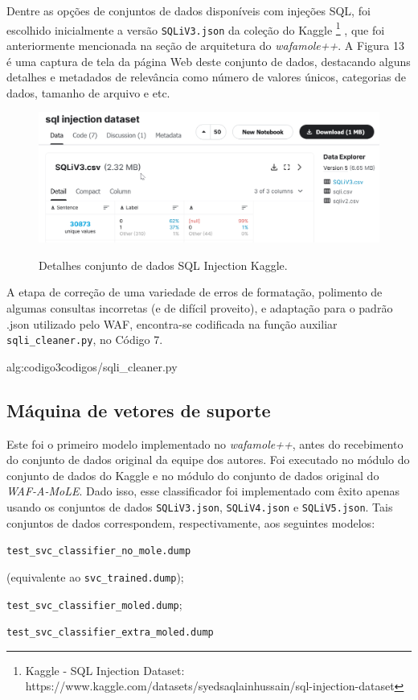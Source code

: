 Dentre as opções de conjuntos de dados disponíveis com injeções SQL, foi escolhido inicialmente a versão \verb+SQLiV3.json+ da coleção do Kaggle \footnote{Kaggle - SQL Injection Dataset: https://www.kaggle.com/datasets/syedsaqlainhussain/sql-injection-dataset} \cite{kaggle_dataset_sql}, que foi anteriormente mencionada na seção de arquitetura do \textit{wafamole++}. A Figura 13 é uma captura de tela da página Web deste conjunto de dados, destacando alguns detalhes e metadados de relevância como número de valores únicos, categorias de dados, tamanho de arquivo e etc.

\begin{figure}[ht]
    \centering
    \caption{Detalhes conjunto de dados SQL Injection Kaggle.}
    \includegraphics[width=16cm]{figuras/sqlInjectionDataset.png} 
    \label{fig:internet} 
\end{figure}

A etapa de correção de uma variedade de erros de formatação, polimento de algumas consultas incorretas (e de difícil proveito), e adaptação para o padrão .json utilizado pelo WAF, encontra-se codificada na função auxiliar \verb+sqli_cleaner.py+, no Código 7.


\label{sec:codigos:sqli_cleaner}
 {alg:codigo3}{codigos/sqli_cleaner.py}
\bigskip


\subsection{Máquina de vetores de suporte}
Este foi o primeiro modelo implementado no \textit{wafamole++}, antes do recebimento do conjunto de dados original da equipe dos autores. Foi executado no módulo do conjunto de dados do Kaggle e no módulo do conjunto de dados original do \textit{WAF-A-MoLE}. Dado isso, esse classificador foi implementado com êxito apenas usando os conjuntos de dados \verb+SQLiV3.json+, \verb+SQLiV4.json+ e \verb+SQLiV5.json+. Tais conjuntos de dados correspondem, respectivamente, aos seguintes modelos:
\begin{alineas}
\item \verb+test_svc_classifier_no_mole.dump+

(equivalente ao \verb+svc_trained.dump+);
\item \verb+test_svc_classifier_moled.dump+;
\item \verb+test_svc_classifier_extra_moled.dump+ 
\end{alineas}

